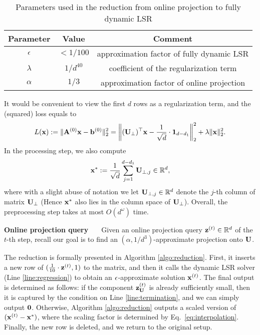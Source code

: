 \begin{table}[ht]
\centering
\begin{tabular}{|c|c|c|}
\hline
Parameter & Value & Comment \\ \hline
$\epsilon$ & $< 1/100$ & approximation factor of fully dynamic LSR \\ \hline
$\lambda$ & $1/d^{40}$ & coefficient of the regularization term \\ \hline
$\alpha$ & $1/3$ & approximation factor of online projection \\ \hline
\end{tabular}
\caption{Parameters used in the reduction from online projection to fully dynamic LSR}
\label{tab:parameters}
\end{table}

It would be convenient to view the first $d$ rows as a regularization term, and the (squared) loss equals to
\begin{align*}
L(\mathbf{x}) := \|\mathbf{A}^{(0)} \mathbf{x} - \mathbf{b}^{(0)}\|_2^2 = \left\|(\mathbf{U}_\perp)^{\top}\mathbf{x} - \frac{1}{\sqrt{d}} \cdot \mathbf{1}_{d-d_1}\right\|_2^2 + \lambda \|\mathbf{x}\|_2^2.
\end{align*}
In the processing step, we also compute
\begin{equation}\label{eq:def_x*}
\mathbf{x}^{*} := \frac{1}{\sqrt{d}} \sum_{j=1}^{d-d_1}\mathbf{U}_{\perp,j} \in \mathbb{R}^d,
\end{equation}
where with a slight abuse of notation we let $\mathbf{U}_{\perp, j} \in \mathbb{R}^d$ denote the $j$-th column of matrix $\mathbf{U}_\perp$ (Hence $\mathbf{x}^{*}$ also lies in the column space of $\mathbf{U}_\perp$).
Overall, the preprocessing step takes at most $O(d^\omega)$ time. 


\vspace{+2mm}
{\bf \noindent Online projection query \ \ } Given an online projection query $\mathbf{z}^{(t)} \in \mathbb{R}^{d}$ of the $t$-th step, recall our goal is to find an $(\alpha, 1/d^3)$-approximate projection onto $\mathbf{U}$.

The reduction is formally presented in Algorithm \ref{algo:reduction}. First, it inserts a new row of $(\frac{1}{10}\cdot \mathbf{z}^{(t)}, 1)$ to the matrix, and then it calls the dynamic LSR solver (Line \ref{line:regression}) to obtain an $\epsilon$-approximate solution $\mathbf{x}^{(t)}$. The final output is determined as follows: if the component $\mathbf{z}_{\mathbf{U}}^{(t)}$ is already sufficiently small, then it is captured by the condition on Line \ref{line:termination}, and we can simply output $\bf{0}$. Otherwise, Algorithm \ref{algo:reduction} outputs a scaled version of $(\mathbf{x}^{(t)} - \mathbf{x}^{*})$, where the scaling factor is determined by Eq.~\eqref{eq:interpolation}. Finally, the new row is deleted, and we return to the original setup.


